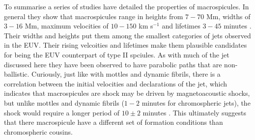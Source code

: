 \documentclass[12pt]{ociamthesis}
\begin{document}
\par To summarise a series of studies have detailed the properties of macrospicules. In general they show that macrospicules range in heights from $7- 70$ Mm, widths of $3-16$ Mm, maximum velocities of $10-150$ km s$^{-1}$ and  lifetimes $3-45$ minutes  \cite{Loboda2019ApJ871230L,Kiss2017ApJ83547K,Bennett2015ApJ808135B,Parenti2002AA384303P,Karovska1994ApJ,Dere1989SoPh,Withbroe1976ApJ,Bohlin1975ApJ197L133B}. Their widths and heights put them among the smallest categories of jets observed in the EUV. Their rising velcoities and lifetimes make them plausible candidates for being the EUV counterpart of type II spciules. As with much of the jet discussed here they have been observed to have parabolic paths that are non-ballistic. Curiously, just like with mottles and dynamic fibrils, there is a correlation between the initial velocities and declarations of the jet, which indicates that macrospicules are shock may be driven by magnetoacoustic shocks, but unlike mottles and dynamic fibrils ($1-2$ minutes for chromospheric jets), the shock would require a longer period of $10\pm 2$ minutes \cite{Loboda2019ApJ871230L}. This ultimately suggests that there macrospicule have a different set of formation conditions than chromospheric cousins. 
\end{document}
